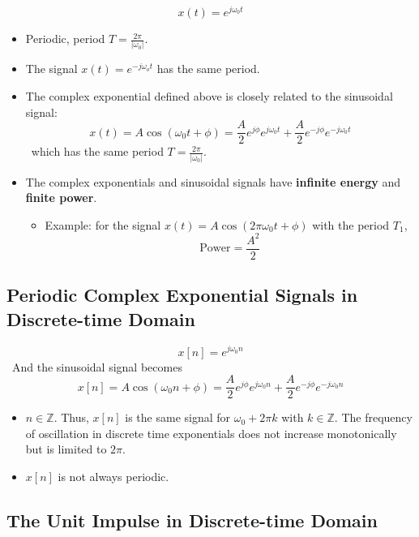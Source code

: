 \documentclass[12pt,a4paper]{article}
\begin{document}
 \[ x(t) = e^{j\omega_0 t} \]
\begin{itemize}
 \item Periodic, period $T = \frac{2\pi}{\lvert \omega_0 \rvert}$.
 \item The signal $x(t) = e^{-j\omega_o t}$ has the same period.
 \item The complex exponential defined above is closely related to the sinusoidal signal:
 \[ x(t) = A \cos(\omega_0 t + \phi) = \frac{A}{2} e^{j\phi}e^{j \omega_0 t} +\frac{A}{2} e^{-j\phi}e^{-j \omega_0 t} \]
  \ which has the same period $T = \frac{2\pi}{\lvert \omega_0 \rvert}$.
 \item The complex exponentials and sinusoidal signals have \textbf{infinite energy} and \textbf{finite
  power}.
 \begin{itemize}
  \item Example: for the signal $x(t)= A \cos(2\pi \omega_{0}t+\phi)$ with the period $T_{1}$,
  \[ \text{Power} = \frac{A^{2}}{2} \]
 \end{itemize}
\end{itemize}

\subsection{Periodic Complex Exponential Signals in Discrete-time Domain}

 \[ x[n] = e^{j\omega_0 n} \]
 \ And the sinusoidal signal becomes 
 \[ x[n] = A \cos(\omega_0 n + \phi) = \frac{A}{2} e^{j\phi}e^{j \omega_0 n} +\frac{A}{2} e^{-j\phi}e^{-j
  \omega_0 n} \]
 \begin{itemize}
  \item $n \in \mathbb{Z}$. Thus, $x[n]$ is the same signal for $\omega_0 + 2\pi k$ with $k \in
   \mathbb{Z}$. The frequency of oscillation in discrete time exponentials does not increase
   monotonically but is limited to $2\pi$.
  \item $x[n]$ is not always periodic.
 \end{itemize}
 
\subsection{The Unit Impulse in Discrete-time Domain}
\end{document}
